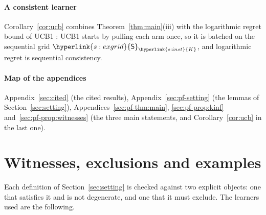\documentclass[11pt]{article}
\newcommand{\sy}[2]{{\hyperlink{#1}{#2}}}
\newcommand{\1}{\mathbf{1}}
\newcommand{\Kar}{\sy{s:inst}{K}}
\newcommand{\Sq}{\sy{s:exgrid}{\mathsf S}}
\begin{document}
\paragraph{A consistent learner} Corollary~\ref{cor:ucb} combines Theorem~\ref{thm:main}(iii) with
the logarithmic regret bound of UCB1 \citep[Theorem~1]{ACF02}: UCB1 starts by pulling each arm once,
so it is batched on the sequential grid $\Sq_{\Kar}$, and logarithmic regret is sequential
consistency.

\paragraph{Map of the appendices} Appendix~\ref{sec:cited} (the cited results),
Appendix~\ref{sec:pf-setting} (the lemmas of Section~\ref{sec:setting}),
Appendices~\ref{sec:pf-thm:main}, \ref{sec:pf-prop:kinf} and~\ref{sec:pf-prop:witnesses} (the three
main statements, and Corollary~\ref{cor:ucb} in the last one).

\section{Witnesses, exclusions and examples}\label{sec:examples}

Each definition of Section~\ref{sec:setting} is checked against two explicit objects: one that
satisfies it and is not degenerate, and one that it must exclude. The learners used are the
following.
\end{document}
